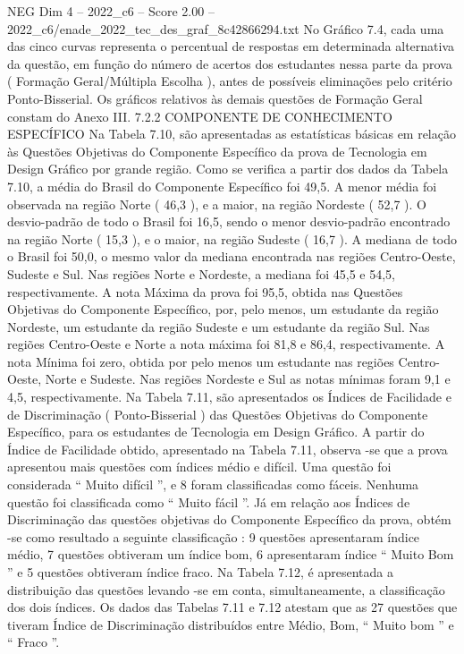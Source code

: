 \begin{textsample}{NEG Dim 4 – 2022\_c6 – Score 2.00 – 2022\_c6/enade\_2022\_tec\_des\_graf\_8c42866294.txt}
No Gráfico 7.4, cada uma das cinco curvas representa o percentual de respostas em determinada alternativa da questão, em função do número de acertos dos estudantes nessa parte da prova ( Formação Geral/Múltipla Escolha ), antes de possíveis eliminações pelo critério Ponto-Bisserial.
Os gráficos relativos às demais questões de Formação Geral constam do Anexo III. 7.2.2 COMPONENTE DE CONHECIMENTO ESPECÍFICO Na Tabela 7.10, são apresentadas as estatísticas básicas em relação às Questões Objetivas do Componente Específico da prova de Tecnologia em Design Gráfico por grande região.
Como se verifica a partir dos dados da Tabela 7.10, a média do Brasil do Componente Específico foi 49,5.
A menor média foi observada na região Norte ( 46,3 ), e a maior, na região Nordeste ( 52,7 ).
O desvio-padrão de todo o Brasil foi 16,5, sendo o menor desvio-padrão encontrado na região Norte ( 15,3 ), e o maior, na região Sudeste ( 16,7 ).
A mediana de todo o Brasil foi 50,0, o mesmo valor da mediana encontrada nas regiões Centro-Oeste, Sudeste e Sul.
Nas regiões Norte e Nordeste, a mediana foi 45,5 e 54,5, respectivamente.
A nota Máxima da prova foi 95,5, obtida nas Questões Objetivas do Componente Específico, por, pelo menos, um estudante da região Nordeste, um estudante da região Sudeste e um estudante da região Sul.
Nas regiões Centro-Oeste e Norte a nota máxima foi 81,8 e 86,4, respectivamente.
A nota Mínima foi zero, obtida por pelo menos um estudante nas regiões Centro-Oeste, Norte e Sudeste.
Nas regiões Nordeste e Sul as notas mínimas foram 9,1 e 4,5, respectivamente.
Na Tabela 7.11, são apresentados os Índices de Facilidade e de Discriminação ( Ponto-Bisserial ) das Questões Objetivas do Componente Específico, para os estudantes de Tecnologia em Design Gráfico.
A partir do Índice de Facilidade obtido, apresentado na Tabela 7.11, observa -se que a prova apresentou mais questões com índices médio e difícil.
Uma questão foi considerada “ Muito difícil ”, e 8 foram classificadas como fáceis.
Nenhuma questão foi classificada como “ Muito fácil ”.
Já em relação aos Índices de Discriminação das questões objetivas do Componente Específico da prova, obtém -se como resultado a seguinte classificação : 9 questões apresentaram índice médio, 7 questões obtiveram um índice bom, 6 apresentaram índice “ Muito Bom ” e 5 questões obtiveram índice fraco.
Na Tabela 7.12, é apresentada a distribuição das questões levando -se em conta, simultaneamente, a classificação dos dois índices.
Os dados das Tabelas 7.11 e 7.12 atestam que as 27 questões que tiveram Índice de Discriminação distribuídos entre Médio, Bom, “ Muito bom ” e “ Fraco ”.

\end{textsample}
